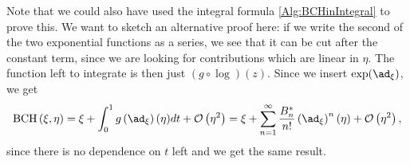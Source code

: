 \begin{remark}
	Note that we could also have used the integral formula 
	\eqref{Alg:BCHinIntegral} to prove this. We want to sketch an alternative 
	proof here: if we write the second of the two exponential functions as a 
	series, we see that it can be cut after the constant term, since we are 
	looking for contributions which are linear in $\eta$. The function left to 
	integrate is then just $(g \circ \log)(z)$. Since we insert 
	$\exp(\ad_{\xi})$, we get
	\begin{equation*}
		\bch{\xi}{\eta}
		=
		\xi + 
		\int_0^1
		g \left( \ad_{\xi} \right)
		(\eta)
		dt
		+ \mathcal{O} \left( \eta^2 \right)
		=
		\xi +
		\sum\limits_{n = 1}^{\infty}
		\frac{B_n^*}{n!}
		\left( \ad_{\xi} \right)^n (\eta)
		+ \mathcal{O} \left( \eta^2 \right),
	\end{equation*}
	since there is no dependence on $t$ left and we get the same result.
\end{remark}


